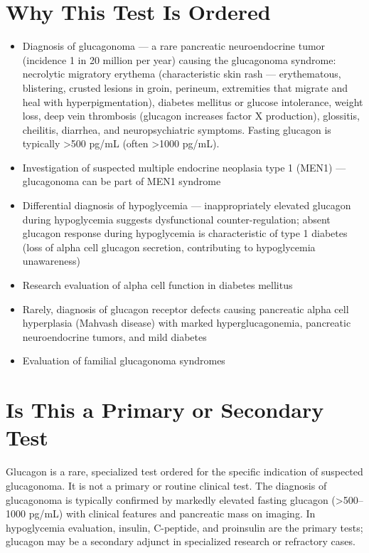 \section*{Why This Test Is Ordered}
\begin{itemize}
  \item Diagnosis of glucagonoma --- a rare pancreatic neuroendocrine tumor (incidence 1 in 20 million per year) causing the glucagonoma syndrome: necrolytic migratory erythema (characteristic skin rash --- erythematous, blistering, crusted lesions in groin, perineum, extremities that migrate and heal with hyperpigmentation), diabetes mellitus or glucose intolerance, weight loss, deep vein thrombosis (glucagon increases factor X production), glossitis, cheilitis, diarrhea, and neuropsychiatric symptoms. Fasting glucagon is typically >500 pg/mL (often >1000 pg/mL).
  \item Investigation of suspected multiple endocrine neoplasia type 1 (MEN1) --- glucagonoma can be part of MEN1 syndrome
  \item Differential diagnosis of hypoglycemia --- inappropriately elevated glucagon during hypoglycemia suggests dysfunctional counter-regulation; absent glucagon response during hypoglycemia is characteristic of type 1 diabetes (loss of alpha cell glucagon secretion, contributing to hypoglycemia unawareness)
  \item Research evaluation of alpha cell function in diabetes mellitus
  \item Rarely, diagnosis of glucagon receptor defects causing pancreatic alpha cell hyperplasia (Mahvash disease) with marked hyperglucagonemia, pancreatic neuroendocrine tumors, and mild diabetes
  \item Evaluation of familial glucagonoma syndromes
\end{itemize}

\section*{Is This a Primary or Secondary Test}
Glucagon is a rare, specialized test ordered for the specific indication of suspected glucagonoma. It is not a primary or routine clinical test. The diagnosis of glucagonoma is typically confirmed by markedly elevated fasting glucagon (>500--1000 pg/mL) with clinical features and pancreatic mass on imaging. In hypoglycemia evaluation, insulin, C-peptide, and proinsulin are the primary tests; glucagon may be a secondary adjunct in specialized research or refractory cases.

